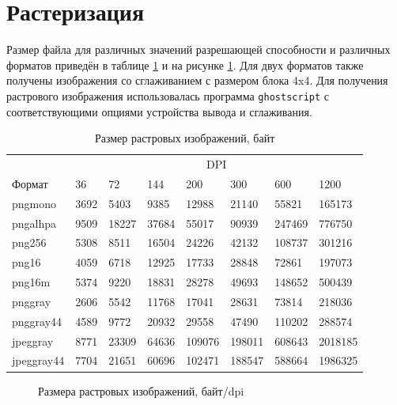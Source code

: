 \documentclass[11pt]{article}
\begin{document}
\section*{Растеризация}
Размер файла для различных значений разрешающей способности и различных форматов приведён в таблице \ref{tab:sizes} и на рисунке \ref{fig:sizes}. Для двух форматов также получены изображения со сглаживанием с размером блока 4x4. Для получения растрового изображения использовалась программа \texttt{ghostscript} с соответствующими опциями устройства вывода и сглаживания.

\begin{table}[h]
\begin{center}
	\begin{tabular}{llllllll}

	&\multicolumn{7}{c}{DPI} \\
	Формат & 36 & 72 & 144 & 200 & 300 & 600 & 1200\\
	pngmono  &  3692 & 5403 & 9385 & 12988 & 21140 & 55821 & 165173 \\
	pngalhpa  &  9509 & 18227 & 37684 & 55017 & 90939 & 247469 & 776750 \\
	png256 & 5308 & 8511 & 16504 & 24226 & 42132 & 108737  & 301216 \\
	png16 & 4059 & 6718 & 12925 & 17733 & 28848 & 72861 & 197073 \\
	png16m  &  5374 & 9220 & 18831 & 28278 & 49693 & 148652 & 500439 \\
	pnggray  &  2606 & 5542 & 11768 & 17041 & 28631 & 73814 & 218036 \\
	pnggray44  &  4589 & 9772 & 20932 & 29558 & 47490 & 110202 & 288574 \\
	jpeggray  &  8771 & 23309 & 64636 & 109076 & 198011 & 608643 & 2018185 \\
	jpeggray44  &  7704 & 21651 & 60696 & 102471 & 188547 & 588664 & 1986325
	\end{tabular}
	\caption{Размер растровых изображений, байт}
	\label{tab:sizes}
\end{center}
\end{table}

\begin{figure}[!h]
\begin{center}
  \begin{tiny}
  
  \end{tiny}  
  \caption{Размера растровых изображений, байт/dpi}
  \label{fig:sizes}
\end{center}
\end{figure}
\end{document}

